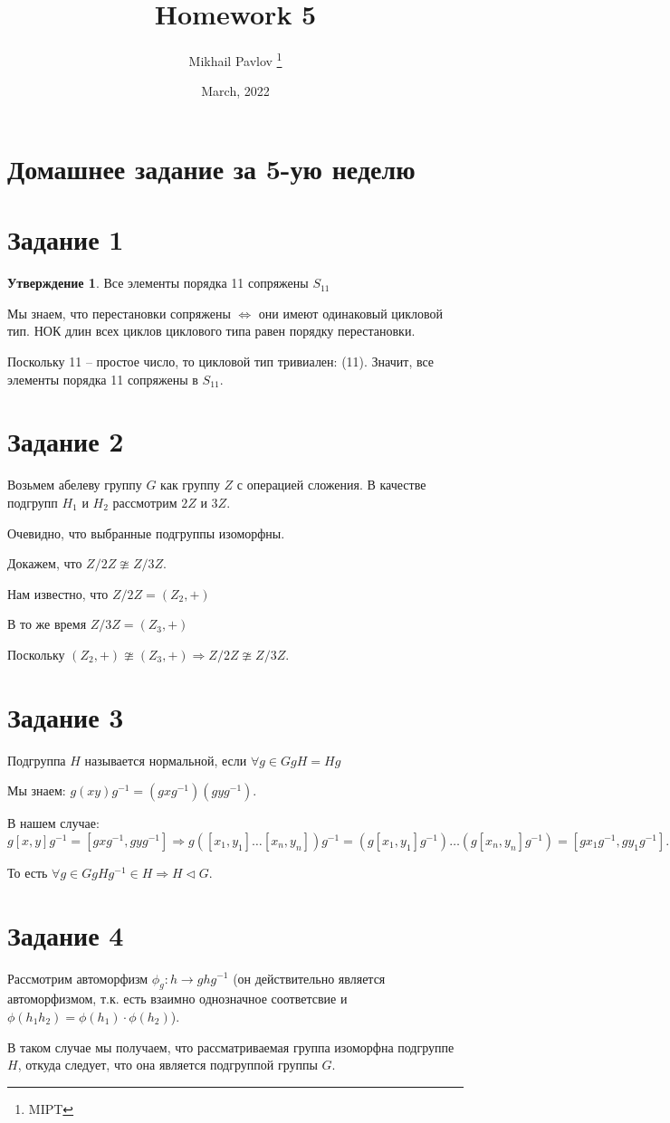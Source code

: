 \documentclass[12pt, a4paper]{article}
\title{Homework 5}
\author{Mikhail Pavlov \thanks{MIPT}}
\date{March, 2022}
\theoremstyle{definition}
\newtheorem{st}[ex]{Утверждение}
\begin{document}
    \section{Домашнее задание за 5-ую неделю}

    \section*{Задание 1}

    \begin{st}
        Все элементы порядка 11 сопряжены $S_{11}$
    \end{st}

        Мы знаем, что перестановки сопряжены $\Leftrightarrow$ они имеют одинаковый цикловой тип.
        НОК длин всех циклов циклового типа равен порядку перестановки.

        Поскольку 11 -- простое число, то цикловой тип тривиален: (11). Значит, все элементы порядка 11 сопряжены в $S_{11}$.

    \section*{Задание 2}

        Возьмем абелеву группу $G$ как группу $Z$ с операцией сложения. В качестве подгрупп $H_1$ и $H_2$ рассмотрим $2Z$ и $3Z$.

        Очевидно, что выбранные подгруппы изоморфны.

        Докажем, что $Z/2Z \ncong Z/3Z$.

        Нам известно, что $Z/2Z = (Z_2, +)$

        В то же время $Z/3Z = (Z_3, +)$

        Поскольку $(Z_2, +) \ncong (Z_3, +) \Rightarrow Z/2Z \ncong Z/3Z$.

    \section*{Задание 3}

        Подгруппа $H$ называется нормальной, если $\forall g \in G gH = Hg$

        Мы знаем: $g(xy)g^{-1} = (gxg^{-1})(gyg^{-1})$.

        В нашем случае: $g[x, y]g^{-1} = [gxg^{-1}, gyg^{-1}] \Rightarrow g([x_1, y_1]\dots[x_n, y_n])g^{-1} = (g[x_1, y_1]g^{-1})\dots(g[x_n, y_n]g^{-1}) = [gx_1g^{-1}, gy_1g^{-1}]\dots[gx_ng^{-1}, gy_ng^{-1}]$

        То есть $\forall g \in G gHg^{-1} \in H \Rightarrow H \lhd G$.

    \section*{Задание 4}

        Рассмотрим автоморфизм $\phi_g : h \rightarrow ghg^{-1}$ (он действительно является автоморфизмом, т.к. есть взаимно однозначное соответсвие и $\phi(h_1 h_2) = \phi(h_1) \cdot \phi (h_2)$).

        В таком случае мы получаем, что рассматриваемая группа изоморфна подгруппе $H$, откуда следует, что она является подгруппой группы $G$.

    
\end{document}
